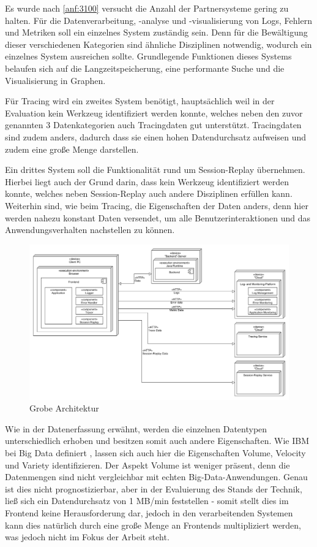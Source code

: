 	Es wurde nach \autoref{anf:3100} versucht die Anzahl der Partnersysteme gering zu halten. Für die Datenverarbeitung, -analyse und -visualisierung von Logs, Fehlern und Metriken soll ein einzelnes System zuständig sein. Denn für die Bewältigung dieser verschiedenen Kategorien sind ähnliche Disziplinen notwendig, wodurch ein einzelnes System ausreichen sollte. Grundlegende Funktionen dieses Systems belaufen sich auf die Langzeitspeicherung, eine performante Suche und die Visualisierung in Graphen.
	
	Für Tracing wird ein zweites System benötigt, hauptsächlich weil in der Evaluation kein Werkzeug identifiziert werden konnte, welches neben den zuvor genannten 3 Datenkategorien auch Tracingdaten gut unterstützt. Tracingdaten sind zudem anders, dadurch dass sie einen hohen Datendurchsatz aufweisen und zudem eine große Menge darstellen.
	
	Ein drittes System soll die Funktionalität rund um Session-Replay übernehmen. Hierbei liegt auch der Grund darin, dass kein Werkzeug identifiziert werden konnte, welches neben Session-Replay auch andere Disziplinen erfüllen kann. Weiterhin sind, wie beim Tracing, die Eigenschaften der Daten anders, denn hier werden nahezu konstant Daten versendet, um alle Benutzerinteraktionen und das Anwendungsverhalten nachstellen zu können.
	
\begin{figure}[H]
	\centering
	\includegraphics[width=0.65\linewidth]{img/04_erstellung-poc/konzept-simple.png}
	\caption{Grobe Architektur}
	\label{fig:grobe-architektur}
\end{figure}

Wie in der Datenerfassung erwähnt, werden die einzelnen Datentypen unterschiedlich erhoben und besitzen somit auch andere Eigenschaften. Wie IBM bei Big Data definiert \cite{ZikopoulosUnderstandingBigData}, lassen sich auch hier die Eigenschaften Volume, Velocity und Variety identifizieren. Der Aspekt Volume ist weniger präsent, denn die Datenmengen sind nicht vergleichbar mit echten Big-Data-Anwendungen. Genau ist dies nicht prognostizierbar, aber in der Evaluierung des Stands der Technik, ließ sich ein Datendurchsatz von 1 MB/min feststellen - somit stellt dies im Frontend keine Herausforderung dar, jedoch in den verarbeitenden Systemen kann dies natürlich durch eine große Menge an Frontends multipliziert werden, was jedoch nicht im Fokus der Arbeit steht.

